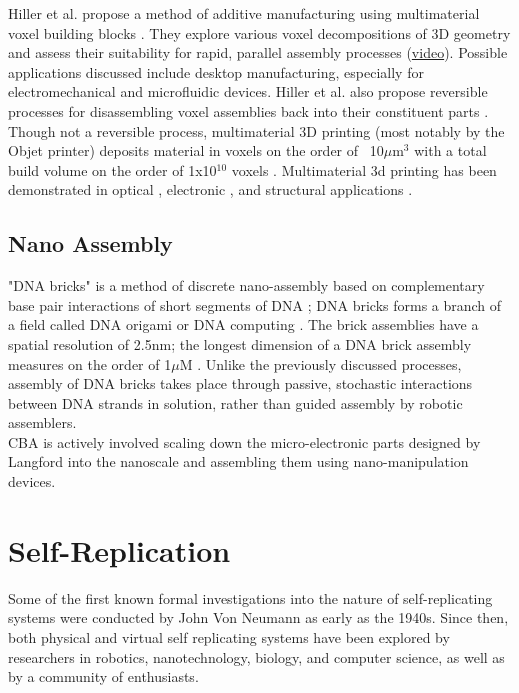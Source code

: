 {Hiller et al. propose a method of additive manufacturing using multimaterial voxel building blocks \cite{Hiller2009a}.  They explore various voxel decompositions of 3D geometry and assess their suitability for rapid, parallel assembly processes (\href{https://www.youtube.com/watch?v=-szjlhVMGh4}{video}).  Possible applications discussed include desktop manufacturing, especially for electromechanical and microfluidic devices.  Hiller et al. also propose reversible processes for disassembling voxel assemblies back into their constituent parts \cite{Hiller2005}.
\\

Though not a reversible process, multimaterial 3D printing (most notably by the Objet printer) deposits material in voxels on the order of ~10$\mu$m$^{3}$ with a total build volume on the order of 1x10$^{10}$ voxels \cite{Objet1000}.  Multimaterial 3d printing has been demonstrated in optical \cite{Willis2012}, electronic \cite{Ahn2009}, and structural applications \cite{Skouras2013} \cite{Schumacher} \cite{Bacher2014}.

\subsection{Nano Assembly}

"DNA bricks" is a method of discrete nano-assembly based on complementary base pair interactions of short segments of DNA \cite{Ke2012}; DNA bricks forms a branch of a field called DNA origami \cite{Rothemund2006} or DNA computing \cite{Seeman1982} \cite{Adleman1994}.  The brick assemblies have a spatial resolution of 2.5nm; the longest dimension of a DNA brick assembly measures on the order of 1$\mu$M \cite{Ke2014}.  Unlike the previously discussed processes, assembly of DNA bricks takes place through passive, stochastic interactions between DNA strands in solution, rather than guided assembly by robotic assemblers.
\\

CBA is actively involved scaling down the micro-electronic parts designed by Langford \cite{Langford2014} into the nanoscale and assembling them using nano-manipulation devices.

\section{Self-Replication}

Some of the first known formal investigations into the nature of self-replicating systems were conducted by John Von Neumann as early as the 1940s.  Since then, both physical and virtual self replicating systems have been explored by researchers in robotics, nanotechnology, biology, and computer science, as well as by a community of enthusiasts.\\

}
